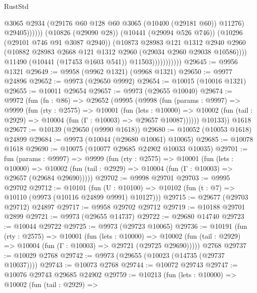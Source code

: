 \begin{lexlean}{RustStd}
\begin{coremodule}
                                        @3065
                                        @2934
                                        (@29176 @60 @128 @60 @3065 (@10400 (@29181 @60)) @11276)
                                        @29405))))))
                            (@10826 (@29090 @28))
                            (@10441 (@29094 @526 @746))
                            (@10296 (@29101 @746 @91 @3087 @2940))
                            (@10873
                              @28983
                              @121
                              @1312
                              @2940
                              @2960
                              (@10882 @28983 @2668 @121 @1312 @2960 (@29034 @2960 @29038 @10586))))
                          @11490
                          (@10441 (@17453 @1603 @541))
                          @11503)))))))))))
@29645 := @9956 @1321
@29649 := @9958 (@9962 @1321) (@9968 @1321)
@29650 := @9977 @24896
@29652 := @9973 (@29650 @9992)
@29654 := @10015 (@10016 @1321)
@29655 := @10011 @29654
@29657 := @9973 (@29655 @10040)
@29674 := @9972
    (fun (fn : @86) =>
    @29652
      (@9995
        (@9998
          (fun (params : @9997) =>
          @9999
            (fun (rty : @2575) =>
            @10001
              (fun (lets : @10000) =>
              @10002 (fun (tail : @2929) => @10004 (fun (Γ : @10003) => @29657 @10087))))))
        @10133))
    @1618
@29677 := @10139 (@29650 (@9990 @1618))
@29680 := @10052 (@10053 @1618) @24899
@29684 := @9973 (@10044 (@29680 @10061) @10065)
@29685 := @10078 @1618
@29690 := @10075 (@10077 @29685 @24902 @10033 @10035)
@29701 := fun (params : @9997) =>
  @9999
    (fun (rty : @2575) =>
    @10001
      (fun (lets : @10000) =>
      @10002 (fun (tail : @2929) => @10004 (fun (Γ : @10003) => @29657 (@29684 @29690)))))
@29702 := @9998 @29701
@29703 := @9995 @29702
@29712 := @10101
    (fun (U : @10100) => @10102 (fun (t : @7) => @10110 (@9973 (@10116 @24899 @9991) @10127)))
@29715 := @29677 (@29703 @29712) @24897
@29717 := @9958 @29702 @29712
@29719 := @10188 @29701 @2899
@29721 := @9973 (@29655 @14737)
@29722 := @29680 @14740
@29723 := @10044 @29722
@29725 := @9973 (@29723 @10065)
@29736 := @10191
    (fun (rty : @2575) =>
    @10001
      (fun (lets : @10000) =>
      @10002 (fun (tail : @2929) => @10004 (fun (Γ : @10003) => @29721 (@29725 @29690)))))
    @2768
@29737 := @10029 @2768
@29742 := @9973 (@29655 (@10023 (@14735 (@29737 @10037))))
@29743 := @10073 @2768
@29744 := @10072 @29743
@29747 := @10076 @29743 @29685 @24902
@29759 := @10213
    (fun (lets : @10000) =>
    @10002
      (fun (tail : @2929) =>

\end{coremodule}
\end{lexlean}
